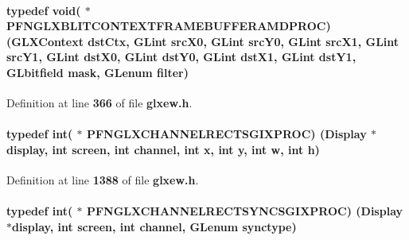 \paragraph[{P\+F\+N\+G\+L\+X\+B\+L\+I\+T\+C\+O\+N\+T\+E\+X\+T\+F\+R\+A\+M\+E\+B\+U\+F\+F\+E\+R\+A\+M\+D\+P\+R\+OC}]{\setlength{\rightskip}{0pt plus 5cm}typedef {\bf void}( $\ast$  P\+F\+N\+G\+L\+X\+B\+L\+I\+T\+C\+O\+N\+T\+E\+X\+T\+F\+R\+A\+M\+E\+B\+U\+F\+F\+E\+R\+A\+M\+D\+P\+R\+OC) ({\bf G\+L\+X\+Context} dst\+Ctx, {\bf G\+Lint} {\bf src\+X0}, {\bf G\+Lint} {\bf src\+Y0}, {\bf G\+Lint} {\bf src\+X1}, {\bf G\+Lint} {\bf src\+Y1}, {\bf G\+Lint} {\bf dst\+X0}, {\bf G\+Lint} {\bf dst\+Y0}, {\bf G\+Lint} {\bf dst\+X1}, {\bf G\+Lint} {\bf dst\+Y1}, {\bf G\+Lbitfield} {\bf mask}, {\bf G\+Lenum} {\bf filter})}\label{glxew_8h_aa6ee7351c2c461241552811fccce5782}


Definition at line {\bf 366} of file {\bf glxew.\+h}.

\paragraph[{P\+F\+N\+G\+L\+X\+C\+H\+A\+N\+N\+E\+L\+R\+E\+C\+T\+S\+G\+I\+X\+P\+R\+OC}]{\setlength{\rightskip}{0pt plus 5cm}typedef {\bf int}( $\ast$  P\+F\+N\+G\+L\+X\+C\+H\+A\+N\+N\+E\+L\+R\+E\+C\+T\+S\+G\+I\+X\+P\+R\+OC) (Display $\ast$display, {\bf int} screen, {\bf int} channel, {\bf int} {\bf x}, {\bf int} {\bf y}, {\bf int} w, {\bf int} h)}\label{glxew_8h_a6f196213ff77878e2d92cb98e509004e}


Definition at line {\bf 1388} of file {\bf glxew.\+h}.

\paragraph[{P\+F\+N\+G\+L\+X\+C\+H\+A\+N\+N\+E\+L\+R\+E\+C\+T\+S\+Y\+N\+C\+S\+G\+I\+X\+P\+R\+OC}]{\setlength{\rightskip}{0pt plus 5cm}typedef {\bf int}( $\ast$  P\+F\+N\+G\+L\+X\+C\+H\+A\+N\+N\+E\+L\+R\+E\+C\+T\+S\+Y\+N\+C\+S\+G\+I\+X\+P\+R\+OC) (Display $\ast$display, {\bf int} screen, {\bf int} channel, {\bf G\+Lenum} synctype)}\label{glxew_8h_a2a107d777f0ed432438bccd38640bedc}


